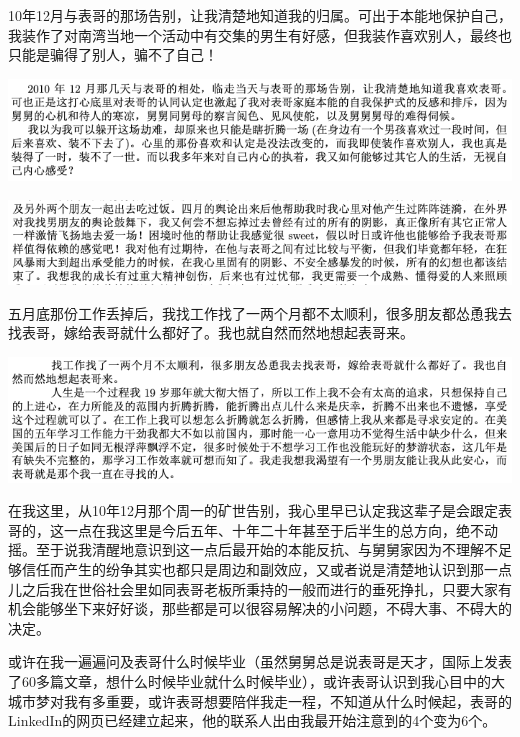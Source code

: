 \documentclass[9pt, b5paper]{article}
\begin{document}
10年12月与表哥的那场告别，让我清楚地知道我的归属。可出于本能地保护自己，我装作了对南湾当地一个活动中有交集的男生有好感，但我装作喜欢别人，最终也只能是骗得了别人，骗不了自己！

\begin{center}
\includegraphics[width=.9\linewidth]{./pic/p1p110-2.png}
\end{center}

\begin{center}
\includegraphics[width=.9\linewidth]{./pic/p1p61-2.png}
\end{center}

五月底那份工作丢掉后，我找工作找了一两个月都不太顺利，很多朋友都怂恿我去找表哥，嫁给表哥就什么都好了。我也就自然而然地想起表哥来。

\begin{center}
\includegraphics[width=.9\linewidth]{./pic/p1p62.png}
\end{center}

在我这里，从10年12月那个周一的矿世告别，我心里早已认定我这辈子是会跟定表哥的，这一点在我这里是今后五年、十年二十年甚至于后半生的总方向，绝不动摇。至于说我清醒地意识到这一点后最开始的本能反抗、与舅舅家因为不理解不足够信任而产生的纷争其实也都只是周边和副效应，又或者说是清楚地认识到那一点儿之后我在世俗社会里如同表哥老板所秉持的一般而进行的垂死挣扎，只要大家有机会能够坐下来好好谈，那些都是可以很容易解决的小问题，不碍大事、不碍大的决定。 

或许在我一遍遍问及表哥什么时候毕业（虽然舅舅总是说表哥是天才，国际上发表了60多篇文章，想什么时候毕业就什么时候毕业），或许表哥认识到我心目中的大城市梦对我有多重要，或许表哥想要陪伴我走一程，不知道从什么时候起，表哥的LinkedIn的网页已经建立起来，他的联系人出由我最开始注意到的4个变为6个。
\end{document}
